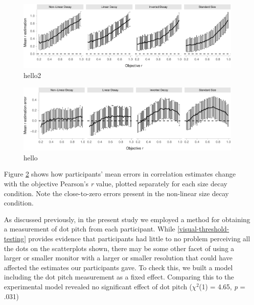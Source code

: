 \documentclass{vgtc}                          %
\begin{document}
\begin{figure}[h]

{\centering \includegraphics[width=1\linewidth]{size_and_scatterplots_files/figure-latex/error-plot-1} 

}

\caption{hello2}\label{fig:error-plot}
\end{figure}

\begin{figure}

{\centering \includegraphics[width=1\linewidth]{size_and_scatterplots_files/figure-latex/changes-with-r-size-1} 

}

\caption{hello}\label{fig:changes-with-r-size}
\end{figure}

Figure \ref{fig:changes-with-r-size} shows how participants' mean errors in correlation
estimates change with the objective Pearson's \emph{r} value, plotted separately for each
size decay condition. Note the close-to-zero errors present in the non-linear size
decay condition.

As discussed previously, in the present study we employed a method for obtaining
a measurement of dot pitch from each participant. While \autoref{visual-threshold-testing}
provides evidence that participants had little to no problem perceiving all the dots
on the scatterplots shown, there may be some other facet of using a larger or smaller
monitor with a larger or smaller resolution that could have affected the estimates
our participants gave. To check this, we built a model including the dot pitch
measurement as a fixed effect. Comparing this to the experimental model revealed
no significant effect of dot pitch (\(\chi^2\)(1) = 4.65, \emph{p} = .031)
\end{document}
